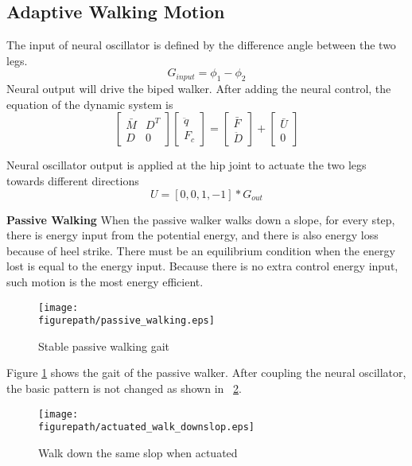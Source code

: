 \subsection{Adaptive Walking Motion}

The input of neural oscillator is defined by the difference angle between the two legs.
\[
G_{input}=\phi_{1}-\phi_{2}
\]
Neural output will drive the biped walker. After adding the neural control, the equation of the dynamic system is
\begin{equation}
\left[
\begin{array}{cc}
\bar{M} &D^{T}\\
D&	0 
\end{array}
\right]
\left[
\begin{array}{c}
\ddot{q} \\
F_{c}
\end{array}
\right]
=
\left[
\begin{array}{c}
\bar{F}\\
\ddot{D}
\end{array}
\right]
+
\left[
\begin{array}{c}
\bar{U}\\
0	
\end{array}
\right]
\end{equation}

Neural oscillator output is applied at the hip joint to actuate the two legs towards different directions
\[
U=[0,0,1,-1]*G_{out}
\]



\textbf{Passive Walking}
When the passive walker walks down a slope, for every step, there is energy input from the potential energy, and there is also energy loss because of heel strike. There must be an equilibrium condition when the energy lost is equal to the energy input.  Because there is no extra control energy input, such motion is the most energy efficient.

\begin{figure}[H]
\centering
\texttt{[image: \\figurepath/passive\_walking.eps]}
\caption{Stable passive walking gait}
\label{fig:passive_walk}
\end{figure}
Figure \ref{fig:passive_walk} shows the gait of the passive walker. 
After coupling the neural oscillator, the basic pattern is not changed  as shown in \figurename ~\ref{fig:stable_active_walk}.

\begin{figure}[H]
\centering
\texttt{[image: \\figurepath/actuated\_walk\_downslop.eps]}
\caption{Walk down the same slop when actuated}
\label{fig:stable_active_walk}
\end{figure}

